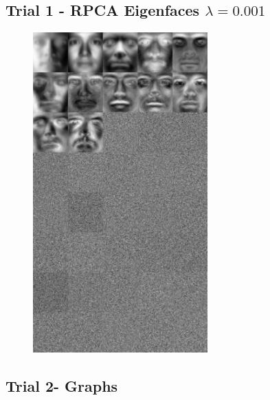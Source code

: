 \documentclass[11pt]{scrartcl} %
\theoremstyle{plain}
\begin{document}
\subsection{Trial 1 - RPCA Eigenfaces $\lambda = 0.001$}

\begin{figure}[H]
\centering
\includegraphics[width=0.6\textwidth]{figures/trial1rpca0dot001eigenfaces.jpg}
\end{figure}

\subsection{Trial 2- Graphs}
\end{document}
